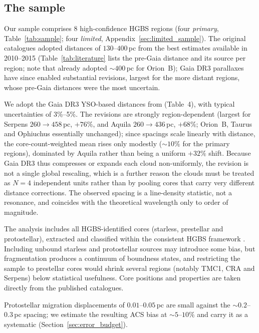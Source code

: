 \documentclass[usenatbib,twoside,twocolumn]{mnras}
\begin{document}
\subsection{The sample}

Our sample comprises 8 high-confidence HGBS regions (four \emph{primary}, Table~\ref{tab:sample}; four \emph{limited}, Appendix~\ref{sec:limited_sample}). The original catalogues \citep{Konyves2015, Konyves2020, Ladjelate2020, Pezzuto2021} adopted distances of $130$--$400$\,pc from the best estimates available in 2010--2015 (Table~\ref{tab:literature} lists the pre-Gaia distance and its source per region; note that \citealt{Konyves2020} already adopted $\sim400$\,pc for Orion~B); Gaia DR3 parallaxes \citep{Zhang2023} have since enabled substantial revisions, largest for the more distant regions, whose pre-Gaia distances were the most uncertain.

We adopt the Gaia DR3 YSO-based distances from \citet{Zhang2023} (Table~4), with typical uncertainties of 3\%--5\%. The revisions are strongly region-dependent (largest for Serpens $260\to458$\,pc, $+76\%$, and Aquila $260\to436$\,pc, $+68\%$; Orion~B, Taurus and Ophiuchus essentially unchanged); since spacings scale linearly with distance, the core-count-weighted mean rises only modestly ($\sim10\%$ for the primary regions), dominated by Aquila rather than being a uniform $+32\%$ shift. Because Gaia DR3 thus compresses or expands each cloud non-uniformly, the revision is not a single global rescaling, which is a further reason the clouds must be treated as $N=4$ independent units rather than by pooling cores that carry very different distance corrections. The observed spacing is a line-density statistic, not a resonance, and coincides with the theoretical wavelength only to order of magnitude.

The analysis includes all HGBS-identified cores (starless, prestellar and protostellar), extracted and classified within the consistent HGBS framework \citep{Konyves2015, Konyves2020}. Including unbound starless and protostellar sources may introduce some bias, but fragmentation produces a continuum of boundness states, and restricting the sample to prestellar cores would shrink several regions (notably TMC1, CRA and Serpens) below statistical usefulness. Core positions and properties are taken directly from the published catalogues.

Protostellar migration displacements of $0.01$--$0.05$\,pc \citep{Kirk2016, Mattern2018} are small against the $\sim0.2$--$0.3$\,pc spacing; we estimate the resulting ACS bias at $\sim5$--$10\%$ and carry it as a systematic (Section~\ref{sec:error_budget}).
\end{document}
